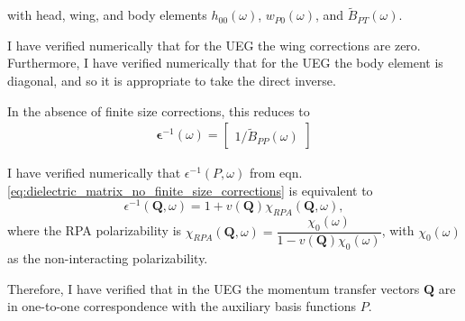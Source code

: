 with head, wing, and body elements $h_{00}(\omega)$, $w_{P0}(\omega)$, and ${\tilde{B}}_{PT}(\omega)$.
\begin{tcolorbox}
 I have verified numerically that for the UEG the wing corrections are zero. Furthermore, I have verified numerically that for the UEG the body element is diagonal, and so it is appropriate to take the direct inverse. 
\end{tcolorbox}
In the absence of finite size corrections, this reduces to 
\begin{align}
    \bm{\epsilon}^{-1}(\omega) = \begin{bmatrix}
        1/{\tilde{B}}_{PP}(\omega)
    \end{bmatrix}
\label{eq:dielectric_matrix_no_finite_size_corrections}
\end{align}
\begin{tcolorbox}
I have verified numerically that ${\epsilon}^{-1}(P,\omega)$ from eqn. \eqref{eq:dielectric_matrix_no_finite_size_corrections} is equivalent to
\begin{equation}
    {\epsilon}^{-1}(\bm{Q},\omega) = {1} + v(\bm{Q}) \chi_{RPA}(\bm{Q},\omega ),
\end{equation}
where the RPA polarizability is $\chi_{RPA}(\bm{Q},\omega ) = \dfrac{\chi_0(\omega )}{1 - v(\bm{Q}) \chi_0(\omega )}$, with $\chi_0(\omega )$ as the non-interacting polarizability.
\end{tcolorbox}
Therefore, I have verified that in the UEG the momentum transfer vectors $\bm{Q}$ are in one-to-one correspondence with the auxiliary basis functions $P$.
